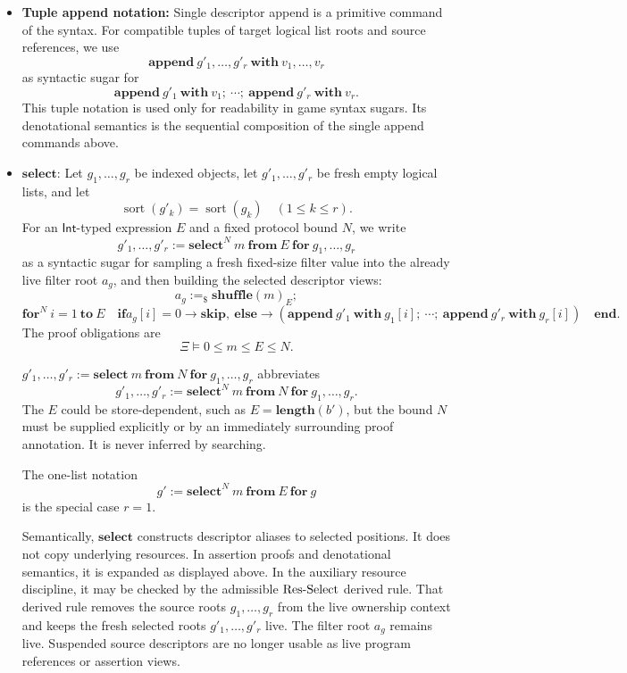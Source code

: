 \documentclass[acmsmall,screen,review,anonymous,nonacm]{acmart}
\theoremstyle{defn_style}
\begin{document}
\begin{itemize}
    \item \textbf{Tuple append notation:}
    Single descriptor append is a primitive command of the syntax. For
    compatible tuples of target logical list roots and source references, we
    use
    \[
    \mathbf{append}\ g'_1,\ldots,g'_r\
    \mathbf{with}\ v_1,\ldots,v_r
    \]
    as syntactic sugar for
    \[
    \mathbf{append}\ g'_1\ \mathbf{with}\ v_1;\
    \cdots;\
    \mathbf{append}\ g'_r\ \mathbf{with}\ v_r .
    \]
    This tuple notation is used only for readability in game syntax sugars. Its
    denotational semantics is the sequential composition of the single append
    commands above.
    
    \item \(\mathbf{select}\):
    Let \(g_1,\ldots,g_r\) be indexed objects, let \(g'_1,\ldots,g'_r\) be
    fresh empty logical lists, and let
    \[
    \operatorname{sort}(g'_k)=\operatorname{sort}(g_k)
    \quad(1\le k\le r).
    \]
    For an \(\mathsf{Int}\)-typed expression \(E\) and a fixed protocol bound
    \(N\), we write
    \[
    g'_1,\ldots,g'_r
    :=
    \mathbf{select}^{N}\ m\ \mathbf{from}\ E\ \mathbf{for}\ g_1,\ldots,g_r
    \]
    as a syntactic sugar for sampling a fresh fixed-size filter
    value into the already live filter root \(a_g\), and then building the
    selected descriptor views:
    \[
    a_g:=_{\$}\mathbf{shuffle}(m)_E;
    \]
    \[
    \mathbf{for}^{N}\ i=1\ \mathbf{to}\ E
    \quad
    \mathbf{if } a_g[i]=0 \rightarrow \mathbf{skip},
    \ \mathbf{else}\rightarrow
    \left(
    \mathbf{append}\ g'_1\ \mathbf{with}\ g_1[i];\ \cdots;\
    \mathbf{append}\ g'_r\ \mathbf{with}\ g_r[i]
    \right)
    \quad
    \mathbf{end}.
    \]
    The proof obligations are
    \[
    \Xi\vDash 0\le m\le E\le N.
    \]

    \(
    g'_1,\ldots,g'_r
    :=
    \mathbf{select}\ m\ \mathbf{from}\ N\ \mathbf{for}\ g_1,\ldots,g_r
    \)
    abbreviates
    \[
    g'_1,\ldots,g'_r
    :=
    \mathbf{select}^{N}\ m\ \mathbf{from}\ N\ \mathbf{for}\ g_1,\ldots,g_r.
    \]
    The \(E\) could be store-dependent, such as \(E=\mathbf{length}(b')\), but the bound \(N\) must be supplied explicitly or by an immediately
    surrounding proof annotation. It is never inferred by searching.

    The one-list notation
    \[
    g' := \mathbf{select}^{N}\ m\ \mathbf{from}\ E\ \mathbf{for}\ g
    \]
    is the special case \(r=1\).

    Semantically, \(\mathbf{select}\) constructs descriptor aliases to selected
    positions. It does not copy underlying resources. In assertion proofs and
    denotational semantics, it is expanded as displayed above. In the auxiliary
    resource discipline, it may be checked by the admissible
    \({\rm Res\mbox{-}Select}\) derived rule. That derived rule removes the
    source roots \(g_1,\ldots,g_r\) from the live ownership context and keeps
    the fresh selected roots \(g'_1,\ldots,g'_r\) live. The filter root \(a_g\)
    remains live. Suspended source descriptors are no longer usable as live program references or assertion
    views. 


\end{itemize}
\end{document}
